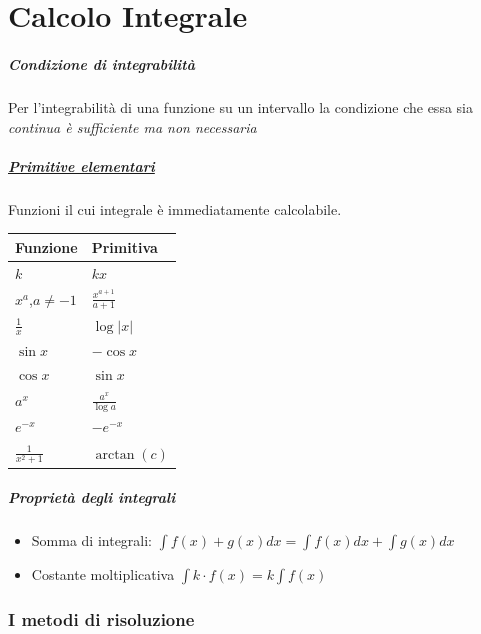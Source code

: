 \documentclass[12pt, a4paper, openany]{book}
\begin{document}
\chapter{Calcolo Integrale}
\paragraph*{Condizione di integrabilità} Per l'integrabilità di una funzione su un intervallo la condizione
che essa sia \emph{continua è sufficiente ma non necessaria}
\begin{multicols}{3}
	\paragraph*{\underline{Primitive elementari}}
	Funzioni il cui integrale è immediatamente calcolabile.
	\columnbreak
	\begin{tabularx}{0.7\textwidth}{ |Y|Y| }
		\hline
		\textbf{Funzione} & \textbf{Primitiva}    \\
		\hline
		$k$               & $kx$                  \\
		$x^a$,$a\neq-1$   & $\frac{x^{a+1}}{a+1}$ \\
		$\frac{1}{x}$     & $\log|x|$             \\
		$\sin x$          & $-\cos x$             \\
		$\cos x $         & $\sin x$              \\
		$a^x$             & $\frac{a^x}{\log a}$  \\
		\hline
		$e^{-x}$          & $-e^{-x}$             \\
		$\frac{1}{x^2+1}$ & $\arctan (c)$         \\
		\hline
	\end{tabularx}
\end{multicols}

\paragraph*{Proprietà degli integrali}
\begin{itemize}
	\item Somma di integrali: $\int f(x)+g(x) dx = \int f(x) dx + \int g(x) dx$
	\item Costante moltiplicativa $\int k \cdot f(x) = k \int f(x)$
\end{itemize}
\subsection*{I metodi di risoluzione}
\end{document}
